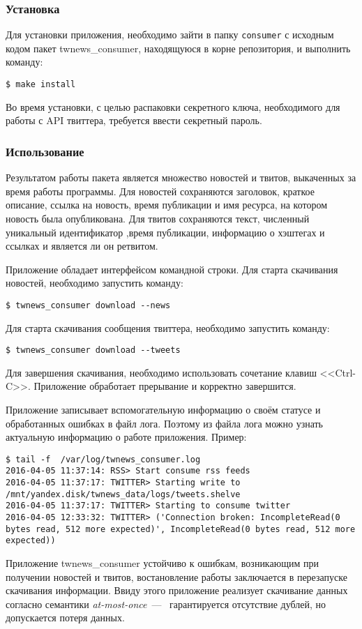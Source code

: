     \subsubsection{Установка}
        Для установки приложения, необходимо зайти в папку \lstinline{consumer} с исходным кодом пакет twnews\_consumer, находящуюся в корне репозитория, и выполнить команду:

        \begin{lstlisting}
$ make install
        \end{lstlisting}
        Во время установки, с целью распаковки секретного ключа, необходимого для работы с API твиттера, требуется ввести секретный пароль.

    \subsubsection{Использование}
        Результатом работы пакета является множество новостей и твитов, выкаченных за время работы программы.
        Для новостей сохраняются заголовок, краткое описание, ссылка на новость, время публикации и имя ресурса, на котором новость была опубликована.
        Для твитов сохраняются текст, численный уникальный идентификатор ,время публикации, информацию о хэштегах и ссылках и является ли он ретвитом.

        Приложение обладает интерфейсом командной строки.
        Для старта скачивания новостей, необходимо запустить команду:
        \begin{lstlisting}
$ twnews_consumer download --news
        \end{lstlisting}
        Для старта скачивания сообщения твиттера, необходимо запустить команду:
        \begin{lstlisting}
$ twnews_consumer download --tweets
        \end{lstlisting}
        Для завершения скачивания, необходимо использовать сочетание клавиш <<Ctrl-C>>.
        Приложение обработает прерывание и корректно завершится.

        Приложение записывает вспомогательную информацию о своём статусе и обработанных ошибках в файл лога.
        Поэтому из файла лога можно узнать актуальную информацию о работе приложения. Пример:
        \begin{lstlisting}
$ tail -f  /var/log/twnews_consumer.log
2016-04-05 11:37:14: RSS> Start consume rss feeds
2016-04-05 11:37:17: TWITTER> Starting write to /mnt/yandex.disk/twnews_data/logs/tweets.shelve
2016-04-05 11:37:17: TWITTER> Starting to consume twitter
2016-04-05 12:33:32: TWITTER> ('Connection broken: IncompleteRead(0 bytes read, 512 more expected)', IncompleteRead(0 bytes read, 512 more expected))
        \end{lstlisting}

        Приложение twnews\_consumer устойчиво к ошибкам, возникающим при получении новостей и твитов,
        востановление работы заключается в перезапуске скачивания информации.
        Ввиду этого приложение реализует скачивание данных согласно семантики \textit{at-most-once}~---~
        гарантируется отсутствие дублей, но допускается потеря данных.